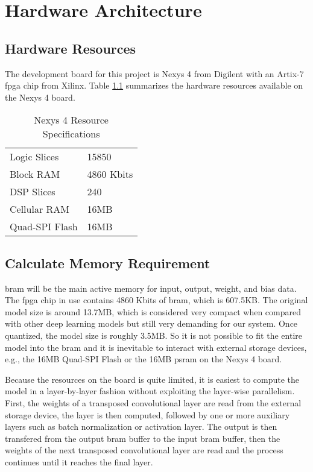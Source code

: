 
\chapter{Hardware Architecture}

\section{Hardware Resources}

The development board for this project is Nexys 4 from Digilent with an Artix-7 \gls{fpga} chip from Xilinx.
Table \ref{table:hardware_resources} summarizes the hardware resources available on the Nexys 4 board.

\begin{table}[h]
  \centering
  \caption{Nexys 4 Resource Specifications}
  \begin{tabular}{l | l}
    Logic Slices & 15850 \\
    Block RAM & 4860 Kbits \\
    DSP Slices & 240 \\
    Cellular RAM & 16MB \\
    Quad-SPI Flash & 16MB
  \end{tabular}
  \label{table:hardware_resources}
\end{table}

\section{Calculate Memory Requirement}

\gls{bram} will be the main active memory for input, output, weight, and bias data. The \gls{fpga} chip in use
contains 4860 Kbits of \gls{bram}, which is 607.5KB. The original model size is around 13.7MB, which is
considered very compact when compared with other deep learning models but still very demanding for
our system. Once quantized, the model size is roughly 3.5MB. So it is not possible to fit the entire model
into the \gls{bram} and it is inevitable to interact with external storage devices, e.g., the 16MB Quad-SPI
Flash or the 16MB \gls{psram} on the Nexys 4 board.

Because the resources on the board is quite limited, it is easiest to compute the model in a layer-by-layer
fashion without exploiting the layer-wise parallelism. First, the weights of a transposed
convolutional layer are read from the external storage device, the layer is then computed, followed by one or
more auxiliary layers such as batch normalization or activation layer. The output is then transfered from
the output \gls{bram} buffer to the input \gls{bram} buffer, then the weights of the next transposed
convolutional layer are read and the process continues until it reaches the final layer.


